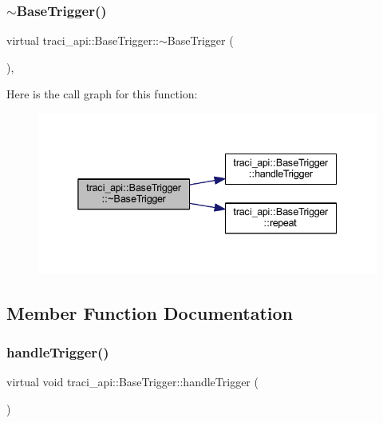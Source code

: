 \subsubsection{\texorpdfstring{$\sim$\+Base\+Trigger()}{~BaseTrigger()}}
{\footnotesize\ttfamily virtual traci\+\_\+api\+::\+Base\+Trigger\+::$\sim$\+Base\+Trigger (\begin{DoxyParamCaption}{ }\end{DoxyParamCaption})\hspace{0.3cm}{\ttfamily [inline]}, {\ttfamily [virtual]}}

Here is the call graph for this function\+:\nopagebreak
\begin{figure}[H]
\begin{center}
\leavevmode
\includegraphics[width=338pt]{classtraci__api_1_1_base_trigger_ae1e572064f6b16fa1de9e5416b6c1a9c_cgraph}
\end{center}
\end{figure}


\subsection{Member Function Documentation}
\mbox{\label{classtraci__api_1_1_base_trigger_a2de2824fb1d228d4c04aa15c272017a5}} 
\subsubsection{\texorpdfstring{handle\+Trigger()}{handleTrigger()}}
{\footnotesize\ttfamily virtual void traci\+\_\+api\+::\+Base\+Trigger\+::handle\+Trigger (\begin{DoxyParamCaption}{ }\end{DoxyParamCaption})\hspace{0.3cm}{\ttfamily [pure virtual]}}



